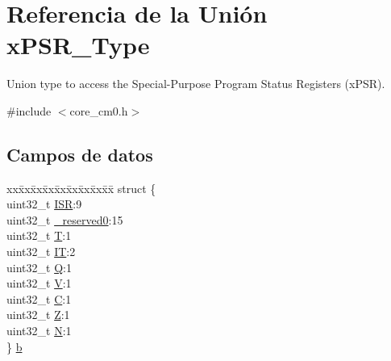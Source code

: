 \hypertarget{unionx_p_s_r___type}{}\section{Referencia de la Unión x\+P\+S\+R\+\_\+\+Type}
\label{unionx_p_s_r___type}


Union type to access the Special-\/\+Purpose Program Status Registers (x\+P\+SR).  




{\ttfamily \#include $<$core\+\_\+cm0.\+h$>$}

\subsection*{Campos de datos}
\begin{DoxyCompactItemize}
\item 
\begin{tabbing}
xx\=xx\=xx\=xx\=xx\=xx\=xx\=xx\=xx\=\kill
struct \{\\
\>uint32\_t \hyperlink{unionx_p_s_r___type_ad502ba7dbb2aab5f87c782b28f02622d}{ISR}:9\\
\>uint32\_t \hyperlink{unionx_p_s_r___type_ac8a6a13838a897c8d0b8bc991bbaf7c1}{\_reserved0}:15\\
\>uint32\_t \hyperlink{unionx_p_s_r___type_a6e1cf12e53a20224f6f62c001d9be972}{T}:1\\
\>uint32\_t \hyperlink{unionx_p_s_r___type_a76485660fe8ad98cdc71ddd7cb0ed777}{IT}:2\\
\>uint32\_t \hyperlink{unionx_p_s_r___type_a65f27ddc4f7e09c14ce7c5211b2e000a}{Q}:1\\
\>uint32\_t \hyperlink{unionx_p_s_r___type_acd4a2b64faee91e4a9eef300667fa222}{V}:1\\
\>uint32\_t \hyperlink{unionx_p_s_r___type_a7a1caf92f32fe9ebd8d1fe89b06c7776}{C}:1\\
\>uint32\_t \hyperlink{unionx_p_s_r___type_a5ae954cbd9986cd64625d7fa00943c8e}{Z}:1\\
\>uint32\_t \hyperlink{unionx_p_s_r___type_abae0610bc2a97bbf7f689e953e0b451f}{N}:1\\
\} \hyperlink{unionx_p_s_r___type_a8d8c45d946ef8df11f4cac72c667e98b}{b}\\


\end{tabbing}
\end{DoxyCompactItemize}
